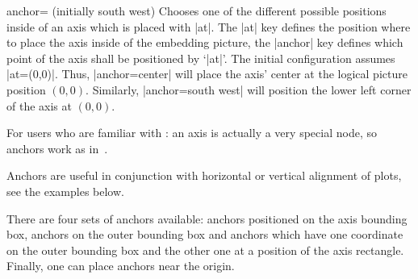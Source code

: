 \begin{pgfplotskey}{anchor= (initially south west)}
\label{option:anchor}
    Chooses one of the different possible positions inside of an axis which is
    placed with |at|. The |at| key defines the position where to place the axis
    inside of the embedding picture, the |anchor| key defines which point of
    the axis shall be positioned by `|at|'. The initial configuration assumes
    |at={(0,0)}|. Thus, |anchor=center| will place the axis' center at the
    logical picture position $(0,0)$. Similarly, |anchor=south west| will
    position the lower left corner of the axis at $(0,0)$.

    For users who are familiar with \Tikz{}: an axis is actually a very special
    node, so anchors work as in~\cite{tikz}.

    Anchors are useful in conjunction with horizontal or vertical alignment of
    plots, see the examples below.

    There are four sets of anchors available: anchors positioned on the axis
    bounding box, anchors on the outer bounding box and anchors which have one
    coordinate on the outer bounding box and the other one at a position of the
    axis rectangle. Finally, one can place anchors near the origin.


\end{pgfplotskey}
